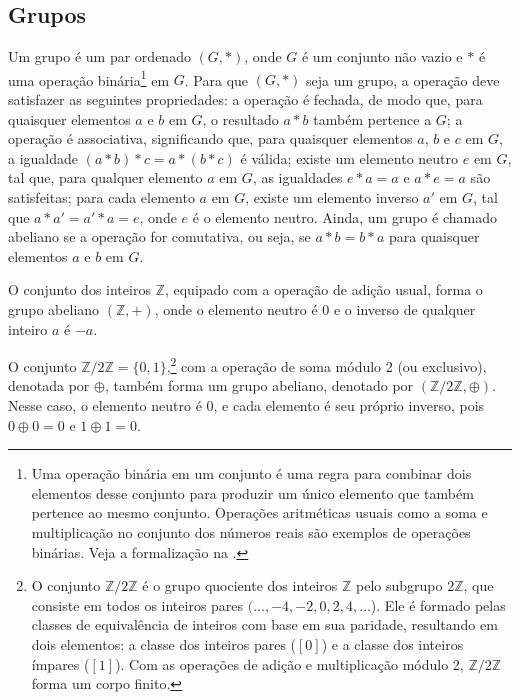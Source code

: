 \subsection{Grupos}

\begin{definition}[Grupo]
Um grupo é um par ordenado $(G, *)$, onde $G$ é um conjunto não vazio e $*$ é
  uma operação binária\footnote{Uma operação binária em um conjunto é uma regra
  para combinar dois elementos desse conjunto para produzir um único elemento
  que também pertence ao mesmo conjunto. Operações aritméticas usuais como
  a soma e multiplicação no conjunto dos números reais são exemplos de operações binárias.
  Veja a formalização na .} em $G$. 
Para que $(G, *)$ seja um grupo, a operação deve
satisfazer as seguintes propriedades: a operação é fechada, de modo que, para
quaisquer elementos $a$ e $b$ em $G$, o resultado $a * b$ também pertence a
$G$; a operação é associativa, significando que, para quaisquer elementos $a$,
$b$ e $c$ em $G$, a igualdade $(a * b) * c = a * (b * c)$ é válida; existe um
elemento neutro $e$ em $G$, tal que, para qualquer elemento $a$ em $G$, as
igualdades $e * a = a$ e $a * e = a$ são satisfeitas; para cada elemento $a$ em
$G$, existe um elemento inverso $a'$ em $G$, tal que $a * a' = a' * a = e$,
onde $e$ é o elemento neutro. Ainda, um grupo é chamado abeliano se a operação
for comutativa, ou seja, se $a * b = b * a$ para quaisquer elementos $a$ e $b$
em $G$.
\end{definition}

\begin{example}
O conjunto dos inteiros $\mathbb{Z}$, equipado com a operação de adição usual,
forma o grupo abeliano $(\mathbb{Z}, +)$, onde o elemento neutro é $0$ e o inverso de qualquer
inteiro $a$ é $-a$.
\end{example}

\begin{example}
O conjunto $\mathbb{Z}/2\mathbb{Z} = \{0, 1\}$,\footnote{
  O conjunto $\mathbb{Z}/2\mathbb{Z}$ é o grupo quociente dos inteiros $\mathbb{Z}$
  pelo subgrupo $ 2\mathbb{Z}$, que consiste em todos os inteiros pares $(\dots, -4, -2, 0, 2, 4, \dots$).
  Ele é formado pelas classes de equivalência de inteiros com base em sua paridade,
  resultando em dois elementos: a classe dos inteiros pares ($[0]$) e a classe dos inteiros ímpares ($[1]$).
  Com as operações de adição e multiplicação módulo 2, $\mathbb{Z}/2\mathbb{Z}$ forma um corpo finito.}
com a operação de soma módulo 2 (ou exclusivo), denotada
por $\oplus$, também forma um grupo abeliano, denotado por $(\mathbb{Z}/2\mathbb{Z}, \oplus)$.
Nesse caso, o elemento neutro é $0$, e cada elemento é seu próprio inverso, 
pois $0 \oplus 0 = 0$ e $1 \oplus 1 = 0$.
\end{example}

